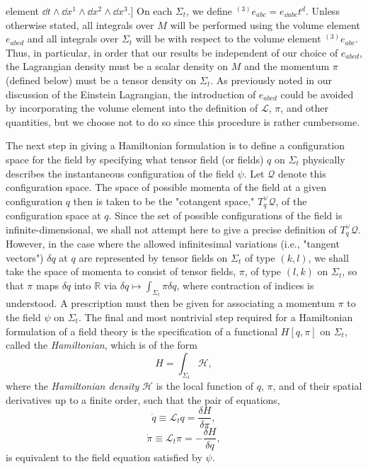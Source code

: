 element \(\dd t\wedge \dd x^1\wedge \dd x^2\wedge \dd x^3\).] On each \(\Sigma_t\), we define
\({}^{(3)}e_{abc}=e_{\dd abc}t^d\). Unless otherwise stated, all integrals over \(M\)
will be performed using the volume element \(e_{abcd}\) and all integrals over
\(\Sigma_t\) will be with respect to the volume element \({}^{(3)}e_{abc}\). Thus,
in particular, in order that our results be independent of our choice of
\(e_{abcd}\), the Lagrangian density must be a scalar density on \(M\) and the
momentum \(\pi\) (defined below) must be a tensor density on \(\Sigma_t\). As
previously noted in our discussion of the Einstein Lagrangian, the introduction of
\(e_{abcd}\) could be avoided by incorporating the volume element into the
definition of \(\mathcal L\), \(\pi\), and other quantities, but we choose not to do
so since this procedure is rather cumbersome.

The next step in giving a Hamiltonian formulation is to define a configuration
space for the field by specifying what tensor field (or fields) \(q\) on \(\Sigma_t\)
physically describes the instantaneous configuration of the field \(\psi\). Let
\(\mathcal Q\) denote this configuration space. The space of possible momenta of the
field at a given configuration \(q\) then is taken to be the "cotangent space,"
\(T_q^\vee\mathcal Q\), of the configuration space at \(q\). Since the set of possible
configurations of the field is infinite-dimensional, we shall not attempt here to
give a precise definition of \(T_q^\vee\mathcal Q\). However, in the case where the
allowed infinitesimal variations (i.e., "tangent vectors") \(\delta q\) at \(q\)
are represented by tensor fields on \(\Sigma_t\) of type \((k,l)\), we shall take the
space of momenta to consist of tensor fields, \(\pi\), of type \((l,k)\) on
\(\Sigma_t\), so that \(\pi\) maps \(\delta q\) into \(\mathbb R\) via
\(\delta q\mapsto\int_{\Sigma_t}\pi\delta q\), where contraction of indices is
understood. A prescription must then be given for associating a momentum \(\pi\) to
the field \(\psi\) on \(\Sigma_t\). The final and most nontrivial step required for a
Hamiltonian formulation of a field theory is the specification of a functional
\(H[q,\pi]\) on \(\Sigma_t\), called the \emph{Hamiltonian}, which is of the form
\begin{equation}
  H=\int_{\Sigma_t}\mathcal H,
  \tag{E.2.1}\label{eq:E.2.1}
\end{equation}
where the \emph{Hamiltonian density} \(\mathcal H\) is the local function of
\(q\), \(\pi\), and of their spatial derivatives up to a finite order, such that the
pair of equations,
\begin{equation}
  \dot q\equiv\mathcal L_tq=\frac{\delta H}{\delta\pi},
  \tag{E.2.2}\label{eq:E.2.2}
\end{equation}
\begin{equation}
  \dot\pi\equiv\mathcal L_t\pi=-\frac{\delta H}{\delta q},
  \tag{E.2.3}\label{eq:E.2.3}
\end{equation}
is equivalent to the field equation satisfied by \(\psi\).

